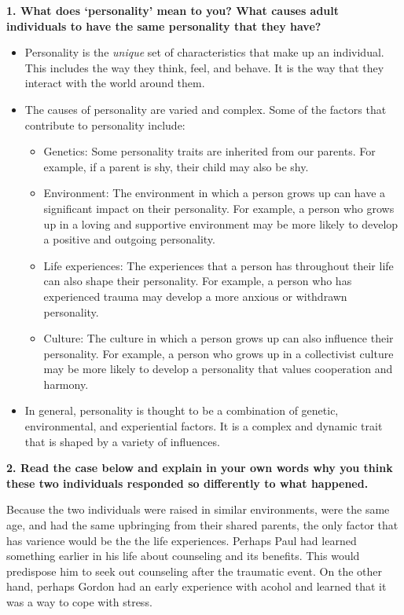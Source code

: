 \begin{center}
    \textbf{1. What does `personality' mean to you? What causes adult individuals to have the same personality that they have?}
\end{center}

\begin{itemize}
    \item Personality is the \textit{unique} set of characteristics that make up an individual. This includes the way they think, feel, and behave. It is the way that they interact with the world around them.
    \item The causes of personality are varied and complex. Some of the factors that contribute to personality include:
    \begin{itemize}
        \item Genetics: Some personality traits are inherited from our parents. For example, if a parent is shy, their child may also be shy.
        \item Environment: The environment in which a person grows up can have a significant impact on their personality. For example, a person who grows up in a loving and supportive environment may be more likely to develop a positive and outgoing personality.
        \item Life experiences: The experiences that a person has throughout their life can also shape their personality. For example, a person who has experienced trauma may develop a more anxious or withdrawn personality.
        \item Culture: The culture in which a person grows up can also influence their personality. For example, a person who grows up in a collectivist culture may be more likely to develop a personality that values cooperation and harmony.
    \end{itemize}
    \item In general, personality is thought to be a combination of genetic, environmental, and experiential factors. It is a complex and dynamic trait that is shaped by a variety of influences.
\end{itemize}

\begin{center}
    \textbf{2. Read the case below and explain in your own words why you think these two individuals responded so differently to what happened.}
\end{center}

Because the two individuals were raised in similar environments, were the same age, and had the same upbringing from their shared parents, the only factor that has varience would be the the life experiences. Perhaps Paul had learned something earlier in his life about counseling and its benefits. This would predispose him to seek out counseling after the traumatic event. On the other hand, perhaps Gordon had an early experience with acohol and learned that it was a way to cope with stress. 

